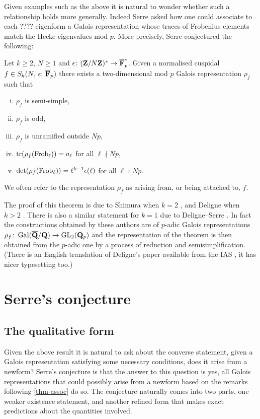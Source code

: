 \documentclass[a4paper,12pt]{article}
\begin{document}
Given examples such as the above it is natural to wonder whether such a relationship holds more generally.
Indeed Serre asked how one could associate to each ???? eigenform a Galois representation whose traces of Frobenius elements match the Hecke eigenvalues mod $p$.
More precisely, Serre conjectured the following: %

\begin{thm}\label{thm-assoc}
Let $k \ge 2$, $N \ge 1$ and $\epsilon\colon (\mathbf{Z}/N\mathbf{Z})^* \to \overline{\mathbf{F}}_p^*$. Given a normalised cuspidal $f\in S_k(N,\,\epsilon;\,\overline{\mathbf{F}}_p)$ there exists a two-dimensional mod $p$ Galois representation $\rho_f$ such that
\begin{enumerate}[(i)]
\item $\rho_f$ is semi-simple,
\item $\rho_f$ is odd,
\item $\rho_f$ is unramified outside $Np$,
\item $\operatorname{tr}(\rho_f (\operatorname{Frob}_\ell)) = a_\ell$ for all $\ell \nmid Np$,
\item $\det(\rho_f (\operatorname{Frob}_\ell)) = \ell^{k-1}\epsilon(\ell)$ for all $\ell \nmid Np$. %
\end{enumerate}
We often refer to the representation $\rho_f$ as arising from, or being attached to, $f$.
\end{thm}

The proof of this theorem is due to Shimura when $k = 2$ \cite{Shimura}, and Deligne when $k > 2$ \cite{Deligne}.
There is also a similar statement for $k =1$ due to Deligne--Serre \cite{DeligneSerre}.
In fact the constructions obtained by these authors are of $p$-adic Galois representations $\rho_f\colon \operatorname{Gal}(\overline{\mathbf{Q}}/\mathbf{Q}) \to \operatorname{GL}_2(\mathbf{Q}_p)$ and the representation of the theorem is then obtained from the $p$-adic one by a process of reduction and semisimplification. %
(There is an English translation of Deligne's paper available from the IAS \cite{DeligneEng}, it has nicer typesetting too.) %



\section{Serre's conjecture}
\subsection{The qualitative form}
Given the above result it is natural to ask about the converse statement, given a Galois representation satisfying some necessary conditions, does it arise from a newform?
Serre's conjecture is that the answer to this question is yes, all Galois representations that could possibly arise from a newform based on the remarks following \cref{thm-assoc} do so.
The conjecture naturally comes into two parts, one weaker existence statement, and another refined form that makes exact predictions about the quantities involved.
\end{document}
